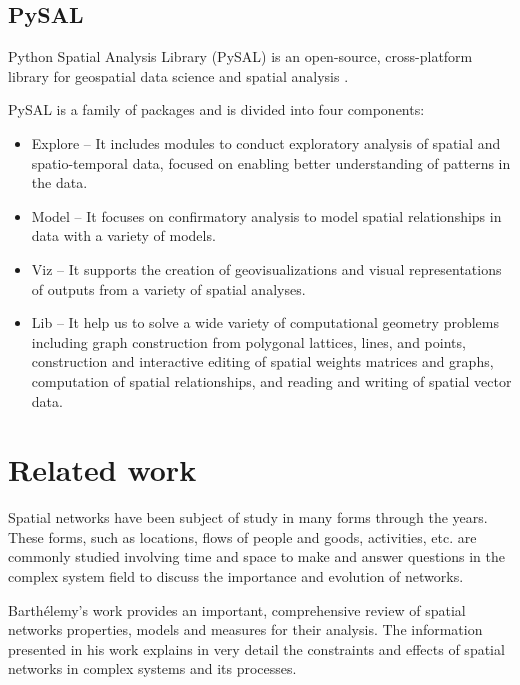 \subsection{PySAL}

Python Spatial Analysis Library (PySAL) is an open-source, cross-platform library for geospatial data science and spatial analysis \cite{pysal2007}.

PySAL is a family of packages and is divided into four components:

\begin{itemize}
	\item Explore -- It includes modules to conduct exploratory analysis of spatial and spatio-temporal data, focused on enabling better understanding of patterns in the data.
	\item Model -- It focuses on confirmatory analysis to model spatial relationships in data with a variety of models.
	\item Viz -- It supports the creation of geovisualizations and visual representations of outputs from a variety of spatial analyses. 
	\item Lib -- It help us to solve a wide variety of computational geometry problems including graph construction from polygonal lattices, lines, and points, construction and interactive editing of spatial weights matrices and graphs, computation of spatial relationships, and reading and writing of spatial vector data.
\end{itemize}

\section{Related work}


Spatial networks have been subject of study in many forms through the years. These forms, such as locations, flows of people and goods, activities, etc. are commonly studied involving time and space to make and answer questions in the complex system field to discuss the importance and evolution of networks.

Barthélemy's work \cite{barthelemy_spatial_2011, barthelemy_2018} provides an important, comprehensive review of spatial networks properties, models and measures for their analysis. The information presented in his work explains in very detail the constraints and effects of spatial networks in complex systems and its processes.

